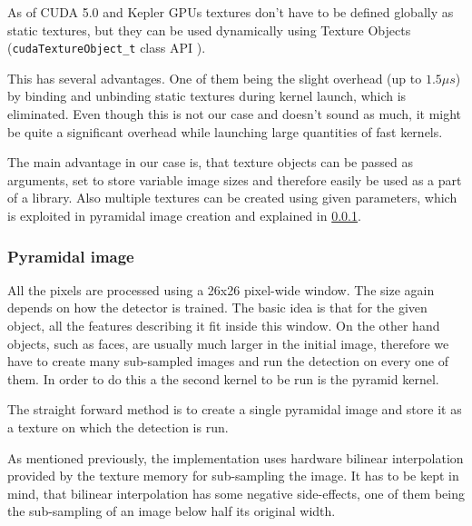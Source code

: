 As of CUDA 5.0 and Kepler GPUs textures don't have to be defined globally as static textures, but they can be used dynamically using Texture Objects (\verb|cudaTextureObject_t| class API \cite{cuda-texture-obj}).

This has several advantages. One of them being the slight overhead (up to $1.5 \mu s$) by binding and unbinding static textures during kernel launch, which is eliminated. Even though this is not our case and doesn't sound as much, it might be quite a significant overhead while launching large quantities of fast kernels.

The main advantage in our case is, that texture objects can be passed as arguments, set to store variable image sizes and therefore easily be used as a part of a library. Also multiple textures can be created using given parameters, which is exploited in pyramidal image creation and explained in \ref{subsubsec:pyramidal}.

\subsubsection{Pyramidal image}\label{subsubsec:pyramidal}

All the pixels are processed using a 26x26 pixel-wide window. The size again depends on how the detector is trained. The basic idea is that for the given object, all the features describing it fit inside this window. On the other hand objects, such as faces, are usually much larger in the initial image, therefore we have to create many sub-sampled images and run the detection on every one of them. In order to do this a the second kernel to be run is the pyramid kernel.

The straight forward method is to create a single pyramidal image and store it as a texture on which the detection is run.

As mentioned previously, the implementation uses hardware bilinear interpolation provided by the texture memory for sub-sampling the image. It has to be kept in mind, that bilinear interpolation has some negative side-effects, one of them being the sub-sampling of an image below half its original width.

